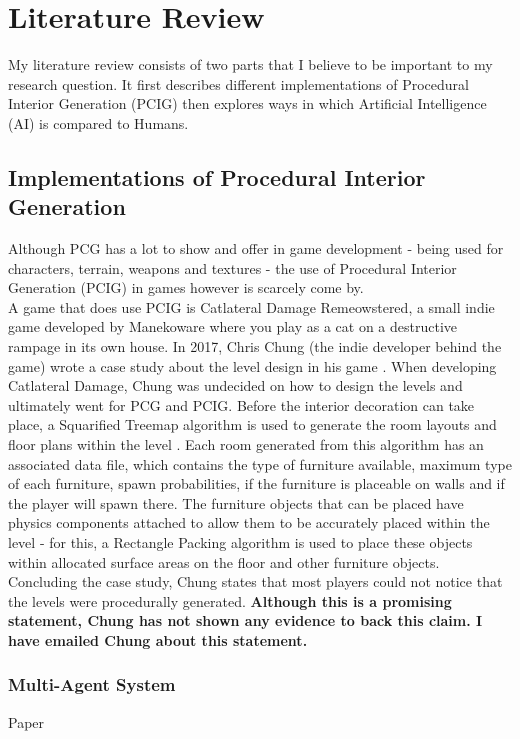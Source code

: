 \section{Literature Review}
My literature review consists of two parts that I believe to be important to my research question.
It first describes different implementations of Procedural Interior Generation (PCIG) then explores
ways in which Artificial Intelligence (AI) is compared to Humans.

\subsection{Implementations of Procedural Interior Generation}
Although PCG has a lot to show and offer in game development - being used for
characters, terrain, weapons and textures - the use of Procedural Interior Generation 
(PCIG) in games however is scarcely come by.
\\
A game that does use PCIG is Catlateral Damage Remeowstered\cite{game:catlateral},
a small indie game developed by Manekoware where you play as a cat on a destructive rampage 
in its own house.
In 2017, Chris Chung (the indie developer behind the game) wrote a case study about the level design in his game \cite{what-is-pcg}.
When developing Catlateral Damage, Chung was 
undecided on how to design the levels and ultimately went for PCG and PCIG\cite{pcg_in_gd}.
Before the interior decoration can take place, a Squarified Treemap algorithm 
is used to generate the room layouts and floor plans within the level \cite{squarified-treemap}.
Each room generated from this algorithm has an associated data file, which contains the type of furniture available, maximum type of each furniture, spawn probabilities, if the furniture is placeable on walls and if the player will spawn there.
The furniture objects that can be placed have physics components attached to allow them to be accurately placed within the level -
for this, a Rectangle Packing algorithm is used to place these objects within allocated surface areas on the floor and other furniture objects.
Concluding the case study, Chung states that most players could not notice that the levels were procedurally generated.
\textbf{Although this is a promising statement, Chung has not shown any evidence to back this claim. I have emailed Chung about this statement.}


\subsubsection*{Multi-Agent System}
Paper \cite{real-time-walkthroughs}
